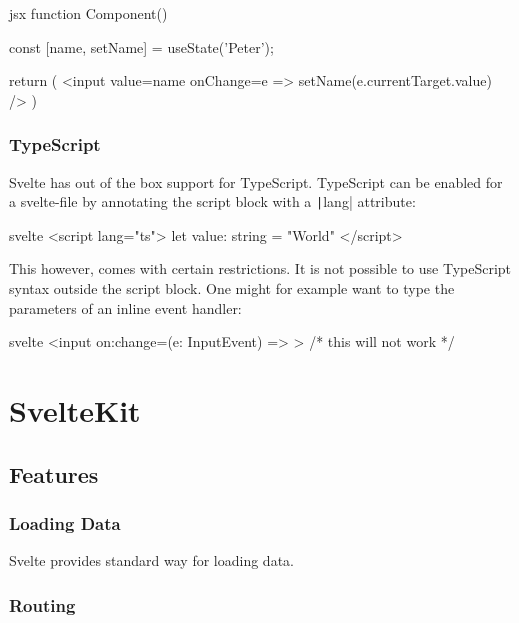 \begin{myminted}{jsx}{}
function Component() {
    const [name, setName] = useState('Peter');

    return ( 
        <input 
            value={name}
            onChange={e => setName(e.currentTarget.value)} 
        />
    )
}
\end{myminted}

\subsubsection{TypeScript}

Svelte has out of the box support for TypeScript. TypeScript can be enabled for a svelte-file by annotating the  script block with a \texttt|lang| attribute:

\begin{myminted}{svelte}{}
<script lang="ts">
    let value: string = "World"
</script>
\end{myminted}

This however, comes with certain restrictions. It is not possible to use TypeScript syntax outside the script block. One might for example want to type the parameters of an inline event handler:

\begin{myminted}{svelte}{}
<input on:change={(e: InputEvent) => {}}> /* this will not work */ 
\end{myminted}

\section{SvelteKit}
\label{sec:sveltekit}


\subsection{Features}

\subsubsection{Loading Data}
\label{sec:sveltekit-loading}

Svelte provides standard way for loading data.

\subsubsection{Routing}

